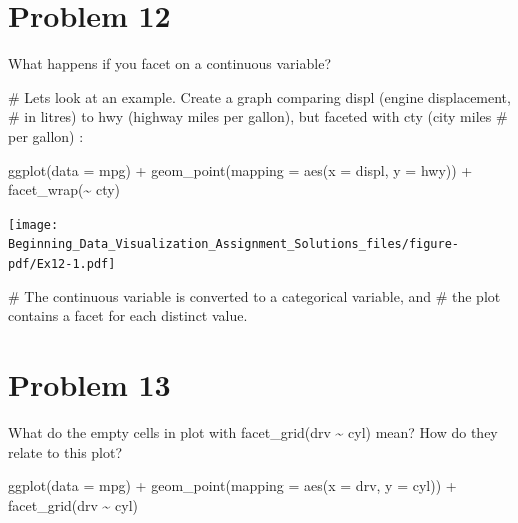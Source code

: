 \documentclass[
  letterpaper,
  DIV=11,
  numbers=noendperiod]{scrreprt}
\newenvironment{Shaded}{\begin{snugshade}}{\end{snugshade}}
\newcommand{\AttributeTok}[1]{\textcolor[rgb]{0.40,0.45,0.13}{#1}}
\newcommand{\CommentTok}[1]{\textcolor[rgb]{0.37,0.37,0.37}{#1}}
\newcommand{\FunctionTok}[1]{\textcolor[rgb]{0.28,0.35,0.67}{#1}}
\newcommand{\NormalTok}[1]{\textcolor[rgb]{0.00,0.23,0.31}{#1}}
\newcommand{\SpecialCharTok}[1]{\textcolor[rgb]{0.37,0.37,0.37}{#1}}
\begin{document}
\section*{Problem 12}\label{problem-12-3}


What happens if you facet on a continuous variable?

\begin{Shaded}
\begin{Highlighting}[]
\CommentTok{\# Let\textquotesingle{}s look at an example. Create a graph comparing displ (engine displacement, }
\CommentTok{\# in litres) to hwy (highway miles per gallon), but faceted with cty (city miles }
\CommentTok{\# per gallon) : }

\FunctionTok{ggplot}\NormalTok{(}\AttributeTok{data =}\NormalTok{ mpg) }\SpecialCharTok{+} 
  \FunctionTok{geom\_point}\NormalTok{(}\AttributeTok{mapping =} \FunctionTok{aes}\NormalTok{(}\AttributeTok{x =}\NormalTok{ displ, }\AttributeTok{y =}\NormalTok{ hwy)) }\SpecialCharTok{+} 
  \FunctionTok{facet\_wrap}\NormalTok{(}\SpecialCharTok{\textasciitilde{}}\NormalTok{ cty)}
\end{Highlighting}
\end{Shaded}

\texttt{[image: Beginning\_Data\_Visualization\_Assignment\_Solutions\_files/figure-pdf/Ex12-1.pdf]}

\begin{Shaded}
\begin{Highlighting}[]
\CommentTok{\# The continuous variable is converted to a categorical variable, and }
\CommentTok{\# the plot contains a facet for each distinct value.}
\end{Highlighting}
\end{Shaded}

\section*{Problem 13}\label{problem-13-3}


What do the empty cells in plot with facet\_grid(drv \textasciitilde{}
cyl) mean? How do they relate to this plot?

\begin{Shaded}
\begin{Highlighting}[]
\FunctionTok{ggplot}\NormalTok{(}\AttributeTok{data =}\NormalTok{ mpg) }\SpecialCharTok{+} 
  \FunctionTok{geom\_point}\NormalTok{(}\AttributeTok{mapping =} \FunctionTok{aes}\NormalTok{(}\AttributeTok{x =}\NormalTok{ drv, }\AttributeTok{y =}\NormalTok{ cyl)) }\SpecialCharTok{+}
  \FunctionTok{facet\_grid}\NormalTok{(drv }\SpecialCharTok{\textasciitilde{}}\NormalTok{ cyl)}
\end{Highlighting}
\end{Shaded}
\end{document}
